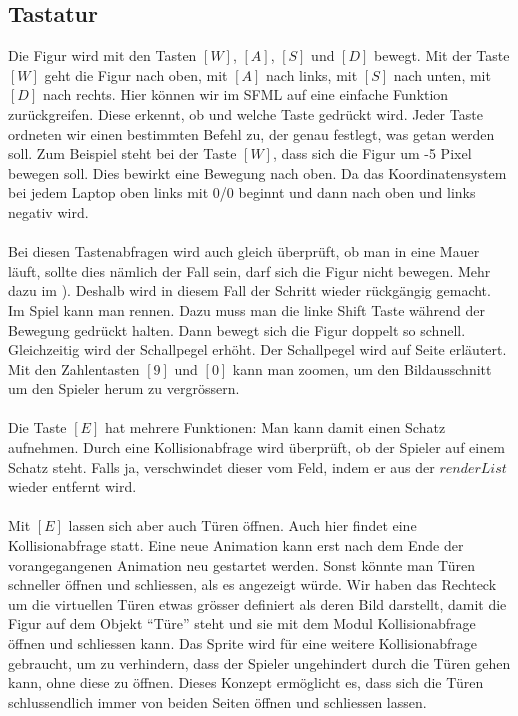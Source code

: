 \documentclass[11pt,a4paper]{scrbook}
\newcommand{\q}[1]{``#1''}
\newcommand{\key}[1]{$[#1]$}
\begin{document}
\subsection{Tastatur}
Die Figur wird mit den Tasten \key{W}, \key{A}, \key{S} und \key{D} bewegt. Mit der Taste \key{W} geht die Figur nach oben, mit \key{A} nach links, mit \key{S} nach unten, mit \key{D} nach rechts. Hier können wir im SFML auf eine einfache Funktion zurückgreifen. Diese erkennt, ob und welche Taste gedrückt wird. Jeder Taste ordneten wir einen bestimmten Befehl zu, der genau festlegt, was getan werden soll. Zum Beispiel steht bei der Taste \key{W}, dass sich die Figur um -5 Pixel bewegen soll. Dies bewirkt eine Bewegung nach oben. Da das Koordinatensystem bei jedem Laptop oben links mit 0/0 beginnt und dann nach oben und links negativ wird.\\
\\
Bei diesen Tastenabfragen wird auch gleich überprüft, ob man in eine Mauer läuft, sollte dies nämlich der Fall sein, darf sich die Figur nicht bewegen. Mehr dazu im ). 
Deshalb wird in diesem Fall der Schritt wieder rückgängig gemacht. 
Im Spiel kann man rennen. 
Dazu muss man die linke Shift Taste während der Bewegung gedrückt halten. Dann bewegt sich die Figur doppelt so schnell. Gleichzeitig wird der Schallpegel erhöht. 
Der Schallpegel wird auf Seite \pageref{Schall} erläutert.
Mit den Zahlentasten \key{9} und \key{0} kann man zoomen, um den Bildausschnitt um den Spieler herum zu vergrössern.\\
\\
Die Taste \key{E} hat mehrere Funktionen: Man kann damit einen Schatz aufnehmen. 
Durch eine Kollisionabfrage wird überprüft, ob der Spieler auf einem Schatz steht. 
Falls ja, verschwindet dieser vom Feld, indem er aus der $renderList$  wieder entfernt wird.\\
\\
Mit \key{E} lassen sich aber auch Türen öffnen. 
Auch hier findet eine Kollisionabfrage statt. 
Eine neue Animation kann erst nach dem Ende der vorangegangenen Animation neu gestartet werden. 
Sonst könnte man Türen schneller öffnen und schliessen, als es angezeigt würde. 
Wir haben das Rechteck um die virtuellen Türen etwas grösser definiert als deren Bild darstellt, damit die Figur auf dem Objekt \q{Türe} steht und sie mit dem Modul Kollisionabfrage öffnen und schliessen kann. Das Sprite wird für eine weitere Kollisionabfrage gebraucht, um zu verhindern, dass der Spieler ungehindert durch die Türen gehen kann, ohne diese zu öffnen. 
Dieses Konzept ermöglicht es, dass sich die Türen schlussendlich immer von beiden Seiten öffnen und schliessen lassen.
\end{document}
